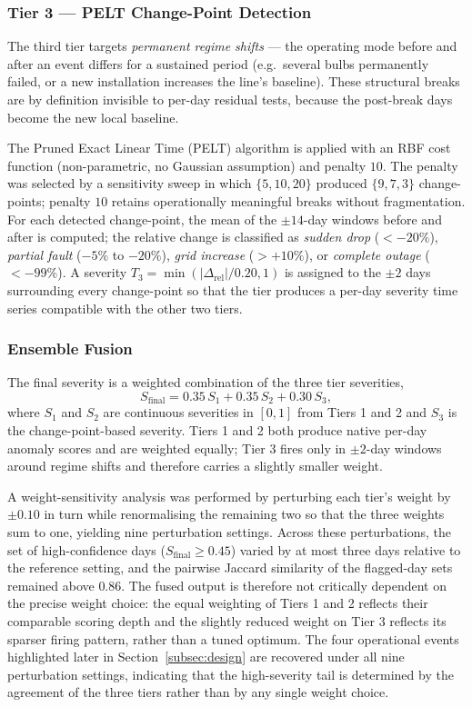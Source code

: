 \documentclass{article}
\begin{document}
\subsubsection{Tier 3 --- PELT Change-Point Detection}

The third tier targets \emph{permanent regime shifts} --- the operating mode before and after an event differs for a sustained period (e.g.\ several bulbs permanently failed, or a new installation increases the line's baseline). These structural breaks are by definition invisible to per-day residual tests, because the post-break days become the new local baseline.

The Pruned Exact Linear Time (PELT) algorithm \cite{killick2012pelt,truong2020ruptures} is applied with an RBF cost function (non-parametric, no Gaussian assumption) and penalty $10$. The penalty was selected by a sensitivity sweep in which $\{5,10,20\}$ produced $\{9,7,3\}$ change-points; penalty $10$ retains operationally meaningful breaks without fragmentation. For each detected change-point, the mean of the $\pm14$-day windows before and after is computed; the relative change is classified as \textit{sudden drop} ($<-20\%$), \textit{partial fault} ($-5\%$ to $-20\%$), \textit{grid increase} ($>+10\%$), or \textit{complete outage} ($<-99\%$). A severity $T_3=\min(|\Delta_{\text{rel}}|/0.20,1)$ is assigned to the $\pm2$ days surrounding every change-point so that the tier produces a per-day severity time series compatible with the other two tiers.

\subsubsection{Ensemble Fusion}

The final severity is a weighted combination of the three tier severities,
\[
S_{\text{final}}=0.35\,S_1+0.35\,S_2+0.30\,S_3,
\]
where $S_1$ and $S_2$ are continuous severities in $[0,1]$ from Tiers 1 and 2 and $S_3$ is the change-point-based severity. Tiers 1 and 2 both produce native per-day anomaly scores and are weighted equally; Tier 3 fires only in $\pm2$-day windows around regime shifts and therefore carries a slightly smaller weight.

A weight-sensitivity analysis was performed by perturbing each tier's weight by $\pm 0.10$ in turn while renormalising the remaining two so that the three weights sum to one, yielding nine perturbation settings. Across these perturbations, the set of high-confidence days ($S_{\text{final}}\geq 0.45$) varied by at most three days relative to the reference setting, and the pairwise Jaccard similarity of the flagged-day sets remained above $0.86$. The fused output is therefore not critically dependent on the precise weight choice: the equal weighting of Tiers 1 and 2 reflects their comparable scoring depth and the slightly reduced weight on Tier 3 reflects its sparser firing pattern, rather than a tuned optimum. The four operational events highlighted later in Section~\ref{subsec:design} are recovered under all nine perturbation settings, indicating that the high-severity tail is determined by the agreement of the three tiers rather than by any single weight choice.
\end{document}

